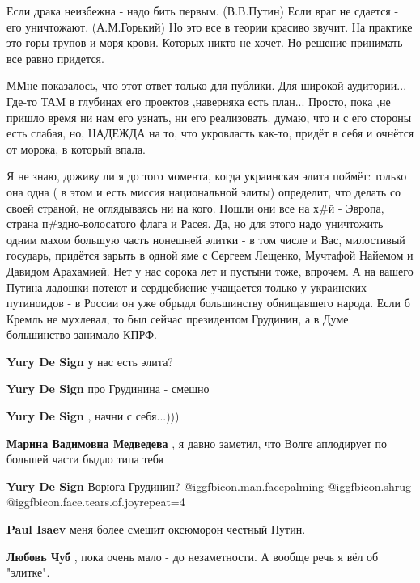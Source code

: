 \begin{itemize}

Если драка неизбежна - надо бить первым. (В.В.Путин) Если враг не сдается - его
уничтожают. (А.М.Горький) Но это все в теории красиво звучит. На практике это
горы трупов и моря крови. Которых никто не хочет. Но решение принимать все
равно придется.


ММне показалось, что этот ответ-только для публики. Для широкой
аудитории... Где-то ТАМ в глубинах его проектов ,наверняка есть
план... Просто, пока ,не пришло время ни нам его узнать, ни его
реализовать. думаю, что и с его стороны есть слабая, но, НАДЕЖДА на то, что
укровласть как-то, придёт в себя и очнётся от морока, в который впала.


Я не знаю, доживу ли я до того момента, когда украинская элита поймёт: только
она одна ( в этом и есть миссия национальной элиты) определит, что делать со
своей страной, не оглядываясь ни на кого. Пошли они все на х\#й - Эвропа, страна
п\#здно-волосатого флага и Расея. Да, но для этого надо уничтожить одним махом
большую часть нонешней элитки - в том числе и Вас, милостивый государь,
придётся зарыть в одной яме с Сергеем Лещенко, Мучтафой Найемом и Давидом
Арахамией. Нет у нас сорока лет и пустыни тоже, впрочем. А на вашего Путина
ладошки потеют и сердцебиение учащается только у украинских путиноидов - в
России он уже обрыдл большинству обнищавшего народа. Если б Кремль не мухлевал,
то был сейчас президентом Грудинин, а в Думе большинство занимало КПРФ.

\begin{itemize} %
\textbf{Yury De Sign} у нас есть элита?

\textbf{Yury De Sign} про Грудинина - смешно

\textbf{Yury De Sign} , начни с себя...)))

\textbf{Марина Вадимовна Медведева} , я давно заметил, что Волге аплодирует по большей части быдло типа тебя

\textbf{Yury De Sign} Ворюга Грудинин? @igg{fbicon.man.facepalming}  @igg{fbicon.shrug}  @igg{fbicon.face.tears.of.joy}{repeat=4} 

\textbf{Paul Isaev} меня более смешит оксюморон честный Путин.

\textbf{Любовь Чуб} , пока очень мало - до незаметности. А вообще речь я вёл об "элитке".


\end{itemize}
\end{itemize}
